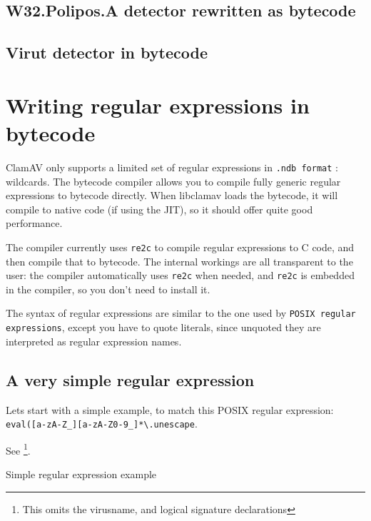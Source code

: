 \subsection{W32.Polipos.A detector rewritten as bytecode}
\subsection{Virut detector in bytecode}
\section{Writing regular expressions in bytecode}
ClamAV only supports a limited set of regular expressions in \verb+.ndb format+ : wildcards.
The bytecode compiler allows you to compile fully generic regular expressions to bytecode directly.
When libclamav loads the bytecode, it will compile to native code (if using the JIT), so it should offer quite good performance.

The compiler currently uses \verb+re2c+ to compile regular expressions to C code, and then compile that to bytecode.
The internal workings are all transparent to the user: the compiler automatically uses \verb+re2c+ when needed, and \verb+re2c+
is embedded in the compiler, so you don't need to install it.

The syntax of regular expressions are similar to the one used by \verb+POSIX regular expressions+, except you have to quote
literals, since unquoted they are interpreted as regular expression names.

\subsection{A very simple regular expression}

Lets start with a simple example, to match this POSIX regular expression:
\verb+eval([a-zA-Z_][a-zA-Z0-9_]*\.unescape+.

See  \footnote{This omits the virusname, and logical signature declarations}.
\begin{program}

\caption{Simple regular expression example}
 \label{prg:reg1}
\end{program}

